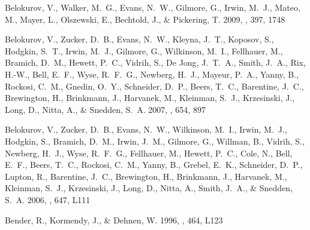 \documentclass[manuscript]{aastex}
\begin{document}
\begin{thebibliography}{381}
{Belokurov}, V., {Walker}, M.~G., {Evans}, N.~W., {Gilmore}, G., {Irwin},
  M.~J., {Mateo}, M., {Mayer}, L., {Olszewski}, E., {Bechtold}, J., \&
  {Pickering}, T. 2009, \mnras, 397, 1748

{Belokurov}, V., {Zucker}, D.~B., {Evans}, N.~W., {Kleyna}, J.~T., {Koposov},
  S., {Hodgkin}, S.~T., {Irwin}, M.~J., {Gilmore}, G., {Wilkinson}, M.~I.,
  {Fellhauer}, M., {Bramich}, D.~M., {Hewett}, P.~C., {Vidrih}, S., {De Jong},
  J.~T.~A., {Smith}, J.~A., {Rix}, H.-W., {Bell}, E.~F., {Wyse}, R.~F.~G.,
  {Newberg}, H.~J., {Mayeur}, P.~A., {Yanny}, B., {Rockosi}, C.~M., {Gnedin},
  O.~Y., {Schneider}, D.~P., {Beers}, T.~C., {Barentine}, J.~C., {Brewington},
  H., {Brinkmann}, J., {Harvanek}, M., {Kleinman}, S.~J., {Krzesinski}, J.,
  {Long}, D., {Nitta}, A., \& {Snedden}, S.~A. 2007, \apj, 654, 897

{Belokurov}, V., {Zucker}, D.~B., {Evans}, N.~W., {Wilkinson}, M.~I., {Irwin},
  M.~J., {Hodgkin}, S., {Bramich}, D.~M., {Irwin}, J.~M., {Gilmore}, G.,
  {Willman}, B., {Vidrih}, S., {Newberg}, H.~J., {Wyse}, R.~F.~G., {Fellhauer},
  M., {Hewett}, P.~C., {Cole}, N., {Bell}, E.~F., {Beers}, T.~C., {Rockosi},
  C.~M., {Yanny}, B., {Grebel}, E.~K., {Schneider}, D.~P., {Lupton}, R.,
  {Barentine}, J.~C., {Brewington}, H., {Brinkmann}, J., {Harvanek}, M.,
  {Kleinman}, S.~J., {Krzesinski}, J., {Long}, D., {Nitta}, A., {Smith}, J.~A.,
  \& {Snedden}, S.~A. 2006, \apjl, 647, L111

{Bender}, R., {Kormendy}, J., \& {Dehnen}, W. 1996, \apjl, 464, L123


\end{thebibliography}
\end{document}
